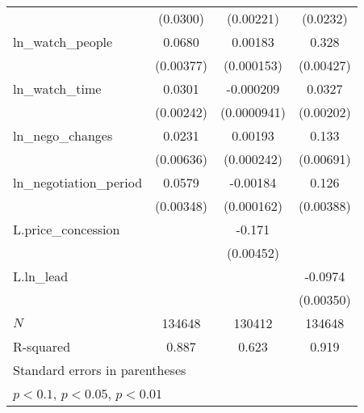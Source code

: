 {\begin{tabular}{l*{3}{c}}
            &    (0.0300)         &   (0.00221)         &    (0.0232)         \\
\addlinespace
ln\_watch\_people&      0.0680\sym{***}&     0.00183\sym{***}&       0.328\sym{***}\\
            &   (0.00377)         &  (0.000153)         &   (0.00427)         \\
\addlinespace
ln\_watch\_time&      0.0301\sym{***}&   -0.000209\sym{**} &      0.0327\sym{***}\\
            &   (0.00242)         & (0.0000941)         &   (0.00202)         \\
\addlinespace
ln\_nego\_changes&      0.0231\sym{***}&     0.00193\sym{***}&       0.133\sym{***}\\
            &   (0.00636)         &  (0.000242)         &   (0.00691)         \\
\addlinespace
ln\_negotiation\_period&      0.0579\sym{***}&    -0.00184\sym{***}&       0.126\sym{***}\\
            &   (0.00348)         &  (0.000162)         &   (0.00388)         \\
\addlinespace
L.price\_concession&                     &      -0.171\sym{***}&                     \\
            &                     &   (0.00452)         &                     \\
\addlinespace
L.ln\_lead   &                     &                     &     -0.0974\sym{***}\\
            &                     &                     &   (0.00350)         \\
\midrule
\(N\)       &      134648         &      130412         &      134648         \\
R-squared   &       0.887         &       0.623         &       0.919         \\
\bottomrule
\multicolumn{4}{l}{\footnotesize Standard errors in parentheses}\\
\multicolumn{4}{l}{\footnotesize \sym{*} \(p<0.1\), \sym{**} \(p<0.05\), \sym{***} \(p<0.01\)}\\
\end{tabular}
}
